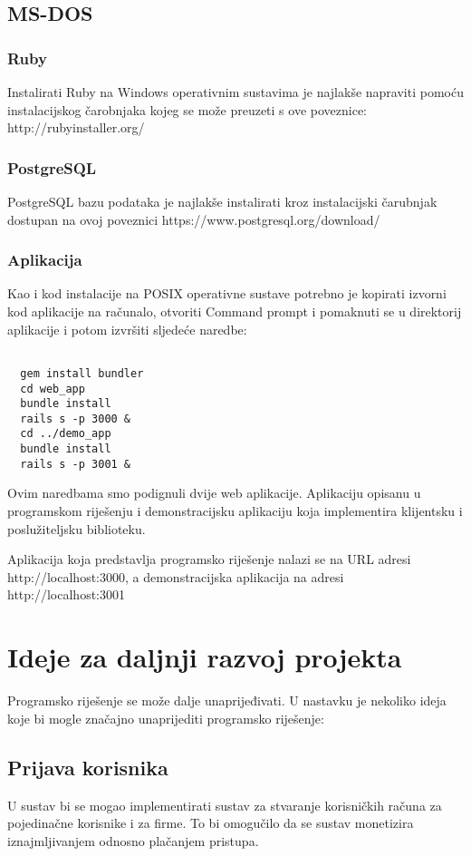 \documentclass[times, utf8, zavrsni]{fer}
\begin{document}
\section{MS-DOS}
\subsection{Ruby}
Instalirati Ruby na Windows operativnim sustavima je najlakše napraviti pomoću
instalacijskog čarobnjaka kojeg se može preuzeti s ove poveznice:
http://rubyinstaller.org/

\subsection{PostgreSQL}
PostgreSQL bazu podataka je najlakše instalirati kroz instalacijski čarubnjak
dostupan na ovoj poveznici https://www.postgresql.org/download/

\subsection{Aplikacija}
Kao i kod instalacije na POSIX operativne sustave potrebno je kopirati izvorni
kod aplikacije na računalo, otvoriti Command prompt i pomaknuti se u direktorij
aplikacije i potom izvršiti sljedeće naredbe:

\begin{lstlisting}

  gem install bundler
  cd web_app
  bundle install
  rails s -p 3000 &
  cd ../demo_app
  bundle install
  rails s -p 3001 &

\end{lstlisting}

Ovim naredbama smo podignuli dvije web aplikacije. Aplikaciju opisanu u
programskom riješenju i demonstracijsku aplikaciju koja implementira klijentsku
i poslužiteljsku biblioteku.

Aplikacija koja predstavlja programsko riješenje nalazi se na URL adresi
http://localhost:3000, a demonstracijska aplikacija na adresi
http://localhost:3001

\chapter{Ideje za daljnji razvoj projekta}
Programsko riješenje se može dalje unaprijeđivati. U nastavku je nekoliko ideja
koje bi mogle značajno unaprijediti programsko riješenje:

\section{Prijava korisnika}
U sustav bi se mogao implementirati sustav za stvaranje korisničkih računa za
pojedinačne korisnike i za firme. To bi omogučilo da se sustav monetizira
iznajmljivanjem odnosno plačanjem pristupa.
\end{document}
